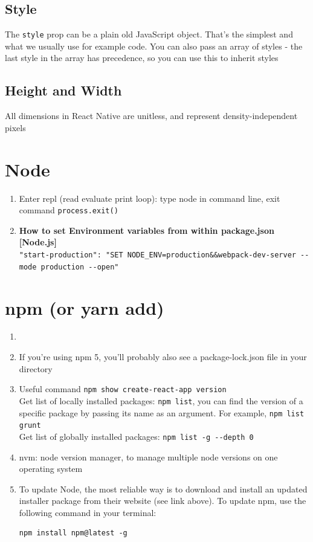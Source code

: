 \documentclass[a4paper, 12pt]{article}
\begin{document}
\subsection{Style}
The \verb|style| prop can be a plain old JavaScript object. That's the simplest and what we usually use for example code. You can also pass an array of styles - the last style in the array has precedence, so you can use this to inherit styles

\subsection{Height and Width}
All dimensions in React Native are unitless, and represent density-independent pixels


\section{Node}
\begin{enumerate}
\item Enter repl (read evaluate print loop): type node in command line, exit command \verb|process.exit()|
\item \textbf{How to set Environment variables from within package.json [Node.js]}\\
\verb|"start-production": "SET NODE_ENV=production&&webpack-dev-server --mode production --open"|
\end{enumerate}



\section{npm (or yarn add)}
\begin{enumerate}

\item 

\item If you're using npm 5, you'll probably also see a package-lock.json file in your directory

\item Useful command \verb|npm show create-react-app version|\\
Get list of locally installed packages: \verb|npm list|, you can find the version of a specific package by passing its name as an argument. For example, \verb|npm list grunt|\\
Get list of globally installed packages: \verb|npm list -g --depth 0|

\item nvm: node version manager, to manage multiple node versions on one operating system

\item To update Node, the most reliable way is to download and install an updated installer package from their website (see link above). To update npm, use the following command in your terminal:
\begin{verbatim}
npm install npm@latest -g
\end{verbatim}
\end{enumerate}
\end{document}

